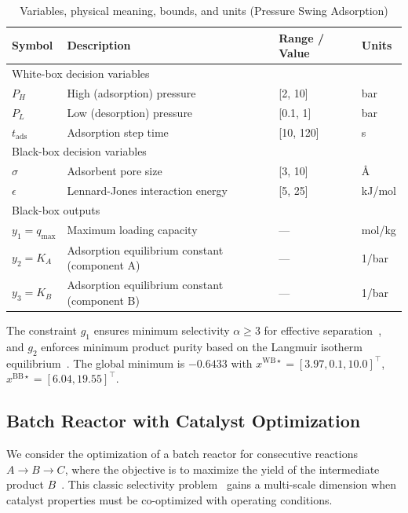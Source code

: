 \documentclass[12pt,a4paper]{article}%
\theoremstyle{plain}%
\theoremstyle{remark}%
\theoremstyle{definition}%
\def\WB{\mathrm{WB}}
\def\BB{\mathrm{BB}}
\providecommand{\DIFaddtex}[1]{{\protect\color{blue}\uwave{#1}}} %
\providecommand{\DIFaddbegin}{} %
\providecommand{\DIFaddend}{} %
\providecommand{\DIFadd}[1]{\texorpdfstring{\DIFaddtex{#1}}{#1}} %
\newcommand{\DIFaddincludegraphics}[2][]{{\color{blue}\fbox{\DIFOincludegraphics[#1]{#2}}}} %
\DeclareRobustCommand{\DIFaddbegin}{\DIFOaddbegin \let\includegraphics\DIFaddincludegraphics} %
\DeclareRobustCommand{\DIFaddend}{\DIFOaddend \let\includegraphics\DIFOincludegraphics} %
\begin{document}
\begin{appendices}
\begin{table}[htbp]
\centering
\caption{Variables, physical meaning, bounds, and units (Pressure Swing Adsorption)}
\label{tab:psa_vars}
\begin{tabular}{@{}llll@{}}
\toprule
\textbf{Symbol} & \textbf{Description} & \textbf{Range / Value} & \textbf{Units} \\
\midrule
\multicolumn{4}{l}{White-box decision variables} \\
\midrule
$P_H$ & High (adsorption) pressure & [2, 10] & bar \\
$P_L$ & Low (desorption) pressure & [0.1, 1] & bar \\
$t_{\text{ads}}$ & Adsorption step time & [10, 120] & s \\
\midrule
\multicolumn{4}{l}{Black-box decision variables} \\
\midrule
$\sigma$ & Adsorbent pore size & [3, 10] & \AA \\
$\epsilon$ & Lennard-Jones interaction energy & [5, 25] & kJ/mol \\
\midrule
\multicolumn{4}{l}{Black-box outputs} \\
\midrule
$y_1 = q_{\max}$ & Maximum loading capacity & --- & mol/kg \\
$y_2 = K_A$ & Adsorption equilibrium constant (component A) & --- & 1/bar \\
$y_3 = K_B$ & Adsorption equilibrium constant (component B) & --- & 1/bar \\
\bottomrule
\end{tabular}
\end{table}

The constraint $g_1$ ensures minimum selectivity $\alpha \geq 3$ for effective separation~\cite{hasan2013cost,yang1987gas}, and $g_2$ enforces minimum product purity based on the Langmuir isotherm equilibrium~\cite{langmuir1918adsorption,ruthven1994psa}. The global minimum \DIFaddbegin \DIFadd{given the parameters in Table~\ref{tab:psa_vars} }\DIFaddend is $-0.6433$ with $x^{\WB\star} = [3.97, 0.1, 10.0]^\top$, $x^{\BB\star} = [6.04, 19.55]^\top$.

\subsection{Batch Reactor with Catalyst Optimization}\label{subsec:app_batch_reactor}

We consider the optimization of a batch reactor for consecutive reactions $A \to B \to C$, where the objective is to maximize the yield of the intermediate product $B$~\cite{parulekar1988yield}. This classic selectivity problem~\cite{luus1999towards} gains a multi-scale dimension when catalyst properties must be co-optimized with operating conditions.


\end{appendices}
\end{document}
